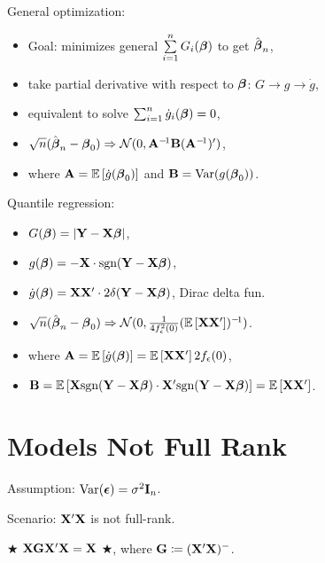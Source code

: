 General optimization: \begin{itemize}[leftmargin = 2em, label = -]
    \vspace{-1em}
    \item Goal: minimizes general $\sum\limits_{i=1}^n G_i(\boldsymbol{\beta})$ to get $\hat{\boldsymbol{\beta}}_n$,
    \item \vspace{-1ex} take partial derivative with respect to $\boldsymbol{\beta}$: $G \rightarrow g \rightarrow \dot{g}$,
    \item equivalent to solve $\sum_{i=1}^n \dot{g}_i(\boldsymbol{\beta}) = 0$,
    \item $\sqrt{n}(\hat{\boldsymbol{\beta}}_n - \boldsymbol{\beta}_0) \Rightarrow \mathcal{N}(0, \mathbf{A}^{-\!1} \mathbf{B} (\mathbf{A}^{-\!1})')$,
        \item [] where $\mathbf{A} = \mathbb{E}\left[ \dot{g}(\boldsymbol{\beta}_0) \right]$ and $\mathbf{B} = \text{Var}(g(\boldsymbol{\beta}_0))$.
\end{itemize}

Quantile regression: \begin{itemize}[leftmargin = 2em, label = -]
    \vspace{-1ex}
    \item $G(\boldsymbol{\beta}) = \lvert \mathbf{Y} - \mathbf{X}\boldsymbol{\beta} \rvert$,
    \item $g(\boldsymbol{\beta}) = -\mathbf{X} \cdot \text{sgn}(\mathbf{Y} - \mathbf{X} \boldsymbol{\beta})$,
    \item $\dot{g}(\boldsymbol{\beta}) = \mathbf{X} \mathbf{X}' \cdot 2 \delta(\mathbf{Y} - \mathbf{X} \boldsymbol{\beta})$, Dirac delta fun.
    \item $\sqrt{n} (\hat{\boldsymbol{\beta}}_n - \boldsymbol{\beta}_0) \Rightarrow \mathcal{N}(0, \frac{1}{4 f_{\epsilon}^2(0)} (\mathbb{E}\left[ \mathbf{X} \mathbf{X}' \right])^{-\!1})$.
    \item [] where $\mathbf{A} = \mathbb{E}\left[ \dot{g}(\boldsymbol{\beta}) \right] = \mathbb{E}\left[ \mathbf{X} \mathbf{X}' \right] 2 f_\epsilon(0)$, 
    \item [] $\mathbf{B} = \mathbb{E}\left[ \mathbf{X} \text{sgn}(\mathbf{Y} - \mathbf{X} \boldsymbol{\beta}) \cdot \mathbf{X}' \text{sgn}(\mathbf{Y} - \mathbf{X} \boldsymbol{\beta}) \right] = \mathbb{E}\left[ \mathbf{X} \mathbf{X}' \right]$.
\end{itemize}




\newcol

\section*{Models Not Full Rank}

Assumption: $\text{Var}(\boldsymbol{\epsilon}) = \sigma^2 \mathbf{I}_{n}$.

Scenario: $\mathbf{X}'\mathbf{X}$ is not full-rank.

$\bigstar$ $\mathbf{X} \mathbf{G} \mathbf{X}' \mathbf{X} = \mathbf{X}$ $\bigstar$, where $\mathbf{G} \coloneqq (\mathbf{X}' \mathbf{X})^{-}$.

